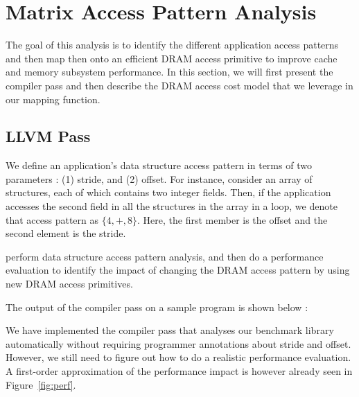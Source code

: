 \documentclass[letterpaper]{article}
\begin{document}
\section{Matrix Access Pattern Analysis}

The goal of this analysis is to identify the different application access
patterns and then map then onto an efficient DRAM access primitive to improve
cache and memory subsystem performance. In this section, we will first present
the compiler pass and then describe the DRAM access cost model that we leverage
in our mapping function.

\subsection{LLVM Pass}

We define an application's data structure access pattern in terms of two 
parameters : (1) stride, and (2) offset. For instance, consider an array 
of structures, each of which contains two integer fields. Then, if the 
application accesses the second field in all the structures in the array
in a loop, we denote that access pattern as $\{4,+,8\}$. Here, the first
member is the offset and the second element is the stride.

 perform data structure access pattern
analysis, and then do a performance evaluation to identify the impact of changing the DRAM
access pattern by using new DRAM access primitives.

The output of the compiler pass on a sample program is shown below :

We have implemented the compiler pass that analyses our benchmark library automatically without requiring
programmer annotations about stride and offset. However, we still need to figure out how to do
a realistic performance evaluation. A first-order approximation of the performance impact is
however already seen in Figure~\ref{fig:perf}.
\end{document}
